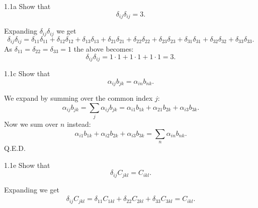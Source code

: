 
\begin{problem}{1.1a}
  Show that
  \begin{equation*}
    \delta_{ij} \delta_{ij} = 3
  .\end{equation*}
\end{problem}

\begin{derivation}
  Expanding $\delta_{ij} \delta_{ij}$ we get
  \begin{equation*}
    \delta_{ij} \delta_{ij} = \delta_{11} \delta_{11} + \delta_{12} \delta_{12} + \delta_{13} \delta_{13} + \delta_{21} \delta_{21} + \delta_{22} \delta_{22} + \delta_{23} \delta_{23} + \delta_{31} \delta_{31} + \delta_{32} \delta_{32} + \delta_{33} \delta_{33}
  .\end{equation*}
  As $\delta_{11} = \delta_{22} = \delta_{33} = 1$ the above becomes:
  \begin{equation*}
    \delta_{ij} \delta_{ij} = 1 \cdot 1 + 1\cdot 1 + 1\cdot 1 = 3
  .\end{equation*}
\end{derivation}


\begin{problem}{1.1c}
  Show that
  \begin{equation*}
    \alpha_{ij} b_{jk} = \alpha_{in} b_{nk}
  .\end{equation*}
\end{problem}

\begin{derivation}
  We expand by summing over the common index $j$:
  \begin{equation*}
    \alpha_{ij} b_{jk} = \sum_j \alpha_{ij} b_{jk} = \alpha_{i1} b_{1k} + \alpha_{21} b_{2k} + \alpha_{i3} b_{3k}
  .\end{equation*}
  Now we sum over $n$ instead:
  \begin{equation*}
    \alpha_{i1} b_{1k} + \alpha_{i2} b_{2k} + \alpha_{i3} b_{3k} = \sum_n \alpha_{in} b_{nk}
  .\end{equation*}
  Q.E.D.
\end{derivation}



\begin{problem}{1.1e}
  Show that
  \begin{equation*}
    \delta_{ij} C_{jkl} = C_{ikl}
  .\end{equation*}
\end{problem}

\begin{derivation}
  Expanding we get
  \begin{align*}
    \delta_{ij} C_{jkl} = \delta_{11} C_{1kl} + \delta_{22} C_{2kl} + \delta_{33} C_{3kl} = C_{ikl}
  .\end{align*}
\end{derivation}

